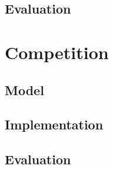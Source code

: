 \subsection{Evaluation}

\section{Competition}
\subsection{Model}
\subsection{Implementation}
\subsection{Evaluation}

